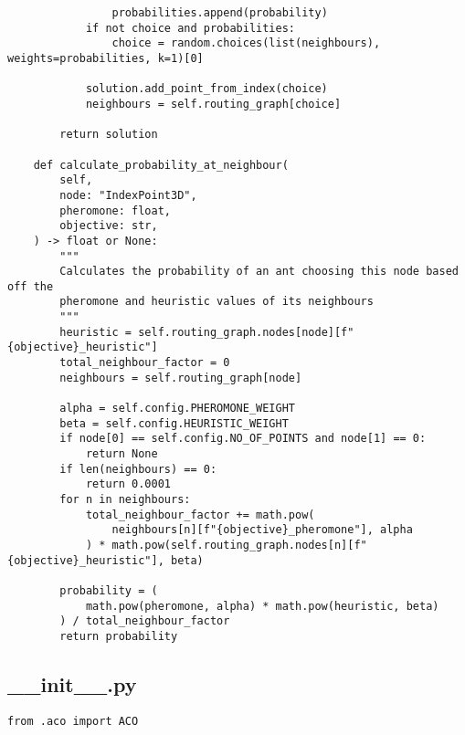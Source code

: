 \begin{verbatim}
                probabilities.append(probability)
            if not choice and probabilities:
                choice = random.choices(list(neighbours), weights=probabilities, k=1)[0]

            solution.add_point_from_index(choice)
            neighbours = self.routing_graph[choice]

        return solution

    def calculate_probability_at_neighbour(
        self,
        node: "IndexPoint3D",
        pheromone: float,
        objective: str,
    ) -> float or None:
        """
        Calculates the probability of an ant choosing this node based off the
        pheromone and heuristic values of its neighbours
        """
        heuristic = self.routing_graph.nodes[node][f"{objective}_heuristic"]
        total_neighbour_factor = 0
        neighbours = self.routing_graph[node]

        alpha = self.config.PHEROMONE_WEIGHT
        beta = self.config.HEURISTIC_WEIGHT
        if node[0] == self.config.NO_OF_POINTS and node[1] == 0:
            return None
        if len(neighbours) == 0:
            return 0.0001
        for n in neighbours:
            total_neighbour_factor += math.pow(
                neighbours[n][f"{objective}_pheromone"], alpha
            ) * math.pow(self.routing_graph.nodes[n][f"{objective}_heuristic"], beta)

        probability = (
            math.pow(pheromone, alpha) * math.pow(heuristic, beta)
        ) / total_neighbour_factor
        return probability

\end{verbatim}
\subsection{__init__.py}
\begin{verbatim}
from .aco import ACO

\end{verbatim}
